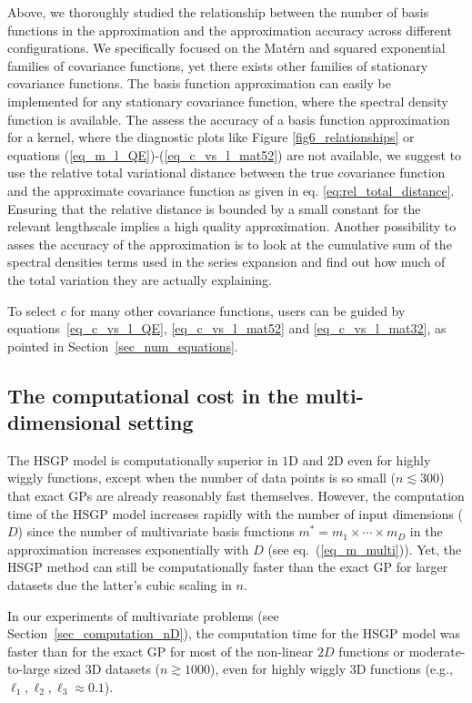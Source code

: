Above, we thoroughly studied the relationship between the number of basis functions in the approximation and the approximation accuracy across different configurations. We specifically focused on the Matérn and squared exponential families of covariance functions, yet there exists other families of stationary covariance functions. The basis function approximation can easily be implemented for any stationary covariance function, where the spectral density function is available. The assess the accuracy of a basis function approximation for a kernel, where the diagnostic plots like Figure \ref{fig6_relationships} or equations (\ref{eq_m_l_QE})-(\ref{eq_c_vs_l_mat52}) are not available, we suggest to use the relative total variational distance between the true covariance function and the approximate covariance function as given in eq. \eqref{eq:rel_total_distance}. Ensuring that the relative distance is bounded by a small constant for the relevant lengthscale implies a high quality approximation. Another possibility to asses the accuracy of the approximation is to look at the cumulative sum of the spectral densities terms used in the series expansion and find out how much of the total variation they are actually explaining. 

To select $c$ for many other covariance functions, users can be guided by equations~\eqref{eq_c_vs_l_QE}, \eqref{eq_c_vs_l_mat52} and \eqref{eq_c_vs_l_mat32}, as pointed in Section~\ref{sec_num_equations}.

\subsection{The computational cost in the multi-dimensional setting}

The HSGP model is computationally superior in $1$D and $2$D even for highly wiggly functions, except when the number of data points is so small ($n \lesssim 300$) that exact GPs are already reasonably fast themselves. However, the computation time of the HSGP model increases rapidly with the number of input dimensions ($D$) since the number of multivariate basis functions $m^*=m_1\times \cdots \times m_D$ in the approximation increases exponentially with $D$ (see eq.~(\ref{eq_m_multi})). Yet, the HSGP method can still be computationally faster than the exact GP for larger datasets due the latter's cubic scaling in $n$. 

In our experiments of multivariate problems (see Section~\ref{sec_computation_nD}), the computation time for the HSGP model was faster than for the exact GP for most of the non-linear $2D$ functions or moderate-to-large sized $3$D datasets ($n \gtrsim 1000$), even for highly wiggly 3D functions (e.g., $\ell_1, \ell_2, \ell_3 \approx 0.1$).

